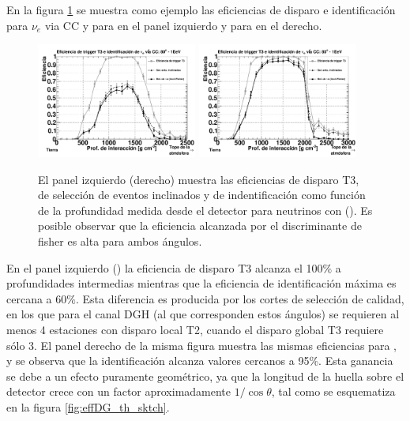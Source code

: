	En la figura \ref{fig:effDG_th} se muestra como ejemplo las eficiencias de disparo e identificación para $\nu_e$ via CC y  para  en el panel izquierdo y para  en el derecho.
	\begin{figure}[h!]
		\begin{center}
			\includegraphics[width=0.47\textwidth]{fig/resultadosAuger/eff_1EeV_80}
			\hfill
			\includegraphics[width=0.47\textwidth]{fig/resultadosAuger/eff_1EeV_85}
			\caption{El panel izquierdo (derecho) muestra las eficiencias de disparo T3, de selección de eventos inclinados y de indentificación como función de la profundidad medida desde el detector para neutrinos con  (). Es posible observar que la eficiencia alcanzada por el discriminante de fisher es alta para ambos ángulos.}
			\label{fig:effDG_th}
		\end{center}
	\end{figure}
	En el panel izquierdo () la eficiencia de disparo T3 alcanza el 100$\%$ a profundidades intermedias mientras que la eficiencia de identificación máxima es cercana a 60$\%$.
	Esta diferencia es producida por los cortes de selección de calidad, en los que para el canal DGH (al que corresponden estos ángulos) se requieren al menos 4 estaciones con disparo local T2, cuando el disparo global T3 requiere sólo 3.
	El panel derecho de la misma figura muestra las mismas eficiencias para , y se observa que la identificación alcanza valores cercanos a 95$\%$.
	Esta ganancia se debe a un efecto puramente geométrico, ya que la longitud de la huella sobre el detector crece con un factor aproximadamente $1/\cos\theta$, tal como se esquematiza en la figura \ref{fig:effDG_th_sktch}.
